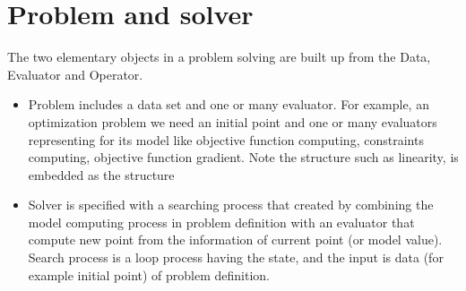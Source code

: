 \documentclass{report}
\begin{document}
\section{Problem and solver}
\par The two elementary objects in a problem solving are built up from the Data, Evaluator and Operator.
\begin{itemize}
\item Problem includes a data set and one or many evaluator. For example, an optimization problem we need 
  an initial point and one or many evaluators representing for its model like objective 
  function computing, constraints computing, objective function gradient. Note the structure such as linearity, 
  is embedded as the structure 
\item Solver is specified with a searching process that created by combining the model computing process in 
  problem definition with an evaluator that compute new point from the information of current point (or model value).
  Search process is a loop process having the state, and the input is data (for example initial point) of 
  problem definition.
\end{itemize}
\end{document}
